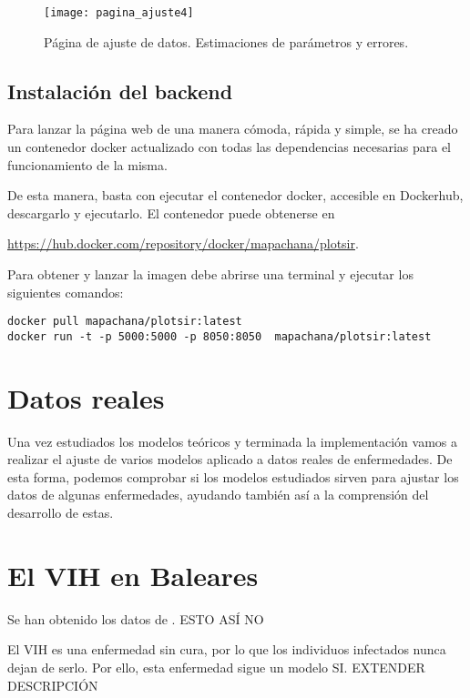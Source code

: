 \begin{figure}
\begin{center}
\caption{Página de ajuste de datos. Estimaciones de parámetros y errores.}
\label{manual: ajuste4}
\texttt{[image: pagina\_ajuste4]}
\end{center}
\end{figure}


\subsection{Instalación del backend}

Para lanzar la página web de una manera cómoda, rápida y simple, se ha creado un contenedor docker actualizado con todas las dependencias necesarias para el funcionamiento de la misma.

De esta manera, basta con ejecutar el contenedor docker, accesible en Dockerhub, descargarlo y ejecutarlo. El contenedor puede obtenerse en 

\href{aquí}{https://hub.docker.com/repository/docker/mapachana/plotsir}.

Para obtener y lanzar la imagen debe abrirse una terminal y ejecutar los siguientes comandos:

\begin{verbatim}
docker pull mapachana/plotsir:latest
docker run -t -p 5000:5000 -p 8050:8050  mapachana/plotsir:latest
\end{verbatim}


\section{Datos reales}

Una vez estudiados los modelos teóricos y terminada la implementación vamos a realizar el ajuste de varios modelos aplicado a datos reales de enfermedades. De esta forma, podemos comprobar si los modelos estudiados sirven para ajustar los datos de algunas enfermedades, ayudando también así a la comprensión del desarrollo de estas.

\section{El VIH en Baleares}

Se han obtenido los datos de \cite{datos_vih}. ESTO ASÍ NO

El VIH es una enfermedad sin cura, por lo que los individuos infectados nunca dejan de serlo. Por ello, esta enfermedad sigue un modelo SI. EXTENDER DESCRIPCIÓN

